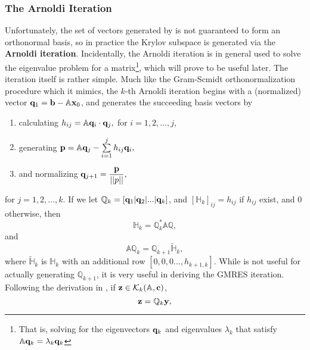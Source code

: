  \subsubsection{The Arnoldi Iteration}
 
Unfortunately, the set of vectors generated by  is not guaranteed to form an orthonormal basis, so in practice the Krylov subspace is generated via the {\bf Arnoldi iteration}. Incidentally, the Arnoldi iteration is in general used to solve the eigenvalue problem for a matrix\footnote{That is, solving for the eigenvectors $\mathbf{q}_k$ and eigenvalues $\lambda_k$ that satisfy $\mathbb{A}\mathbf{q}_k = \lambda_k\mathbf{q}_k$}, which will prove to be useful later. The iteration itself is rather simple. Much like the Gram-Scmidt orthonormalization procedure which it mimics, the $k$-th Arnoldi iteration begins with a (normalized) vector $\mathbf{q}_1 = \mathbf{b} - \mathbb{A}\mathbf{x}_0$, and generates the succeeding basis vectors by 
\begin{enumerate}
  \renewcommand{\labelenumi}{\textbf{\theenumi}}
\renewcommand{\theenumi}{ARNOLDI-\arabic{enumi})}
\item calculating $h_{ij} = \mathbb{A}\mathbf{q}_{i} \cdot \mathbf{q}_j,$ for $i = 1,2,...,j$,
\item generating $\Vector{p} = \mathbb{A}\Vector{q}_j - \sum{i=1}{j}{h_{ij}\Vector{q}_i},$ 
\item and normalizing $\mathbf{q}_{j+1} = \dfrac{\mathbf{p}}{||p||},$
\end{enumerate}
for $j = 1,2,...,k$. If we let $\mathbb{Q}_k = [ \mathbf{q}_1| \mathbf{q}_2 | ... |\mathbf{q}_k ]$, and $[\mathbb{H}_k]_{ij} = h_{ij}$ if $h_{ij}$ exist, and $0$ otherwise, then 
\begin{equation}
\mathbb{H}_k = \mathbb{Q}_k^* \mathbb{A}\mathbb{Q},
\end{equation}
and 
\begin{equation}\label{eq:Qiter}
\mathbb{A}\mathbb{Q}_k = \mathbb{Q}_{k+1}\mathbb{\tilde{H}}_k,
\end{equation}
where $\mathbb{\tilde{H}}_k$ is $\mathbb{H}_k$ with an additional row $[0,0,0...,h_{k+1,k}]$. While  is not useful for actually generating $\mathbb{Q}_{k+1}$, it is very useful in deriving the GMRES iteration. Following the derivation in , if $\mathbf{z} \in \mathcal{K}_k(\mathbb{A},\mathbf{c})$, 
\begin{equation}
\mathbf{z} = \mathbb{Q}_k \mathbf{y},
\end{equation}
